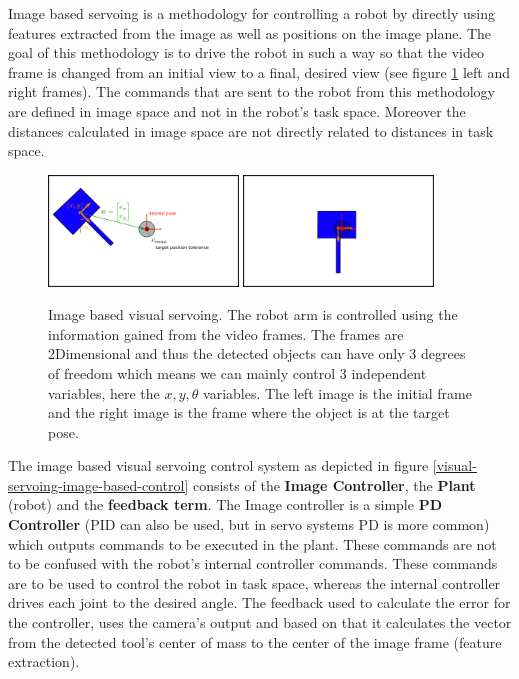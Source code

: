 Image based servoing is a methodology for controlling a robot by directly using features extracted from the image as well as positions on the image plane. The goal of this methodology is 
to drive the robot in such a way so that the video frame is changed from an initial view to a final, desired view (see figure \ref{image-based-servoing-start-end} left and right frames). The commands 
that are sent to the robot from this methodology are defined in image space and not in the robot's task space. Moreover the distances calculated in image space are not directly related to distances 
in task space.

\begin{center}
\begin{figure}[H]
\centering
\includegraphics[width=0.45\textwidth]{images/visual_servo_start.png}
\includegraphics[width=0.45\textwidth]{images/visual_servo_end.png}\\
\caption{Image based visual servoing. The robot arm is controlled using the information gained from the video frames. The frames are 2Dimensional and thus 
the detected objects can have only 3 degrees of freedom which means we can mainly control 3 independent variables, here the $x,y,θ$ variables. The left image 
is the initial frame and the right image is the frame where the object is at the target pose.}
\label{image-based-servoing-start-end}
\end{figure}
\end{center}

The image based visual servoing control system as depicted in figure \ref{visual-servoing-image-based-control} consists of the \textbf{Image Controller}, the \textbf{Plant} (robot) and the \textbf{feedback term}. The Image controller is a simple 
\textbf{PD Controller} (PID can also be used, but in servo systems PD is more common) which outputs commands to be executed in the plant. These commands are not to be confused with the robot's internal controller commands. 
These commands are to be used to control the robot in task space, whereas the internal controller drives each joint to the desired angle. The feedback used to calculate the error for the controller, uses the camera's 
output and based on that it calculates the vector from the detected tool's center of mass to the center of the image frame (feature extraction).

